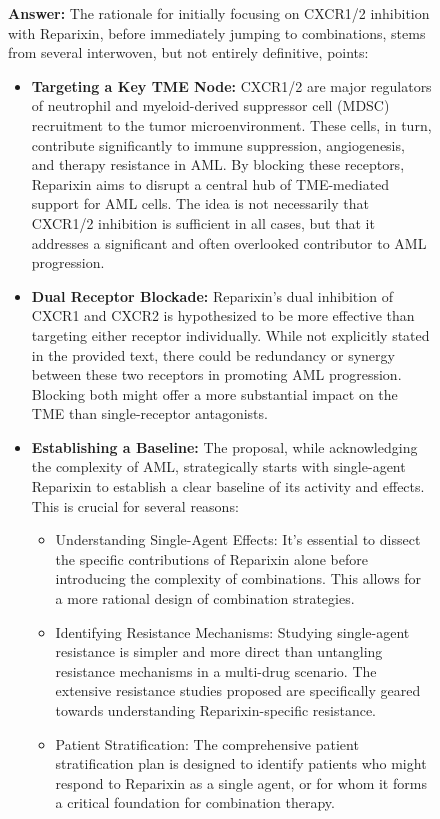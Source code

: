 \begin{figure}[htbp!]
\begin{tcolorbox}
\textbf{Answer:} The rationale for initially focusing on CXCR1/2 inhibition with Reparixin, before immediately jumping to combinations, stems from several interwoven, but not entirely definitive, points:
\begin{itemize}
    \item \textbf{Targeting a Key TME Node:} CXCR1/2 are major regulators of neutrophil and myeloid-derived suppressor cell (MDSC) recruitment to the tumor microenvironment. These cells, in turn, contribute significantly to immune suppression, angiogenesis, and therapy resistance in AML. By blocking these receptors, Reparixin aims to disrupt a central hub of TME-mediated support for AML cells. The idea is not necessarily that CXCR1/2 inhibition is sufficient in all cases, but that it addresses a significant and often overlooked contributor to AML progression.
    \item \textbf{Dual Receptor Blockade:} Reparixin's dual inhibition of CXCR1 and CXCR2 is hypothesized to be more effective than targeting either receptor individually. While not explicitly stated in the provided text, there could be redundancy or synergy between these two receptors in promoting AML progression. Blocking both might offer a more substantial impact on the TME than single-receptor antagonists.
    \item \textbf{Establishing a Baseline:} The proposal, while acknowledging the complexity of AML, strategically starts with single-agent Reparixin to establish a clear baseline of its activity and effects. This is crucial for several reasons:
    \begin{itemize}
        \item Understanding Single-Agent Effects: It's essential to dissect the specific contributions of Reparixin alone before introducing the complexity of combinations. This allows for a more rational design of combination strategies.
        \item Identifying Resistance Mechanisms: Studying single-agent resistance is simpler and more direct than untangling resistance mechanisms in a multi-drug scenario. The extensive resistance studies proposed are specifically geared towards understanding Reparixin-specific resistance.
        \item Patient Stratification: The comprehensive patient stratification plan is designed to identify patients who might respond to Reparixin as a single agent, or for whom it forms a critical foundation for combination therapy.
    \end{itemize}

\end{itemize}
\end{tcolorbox}
\end{figure}
